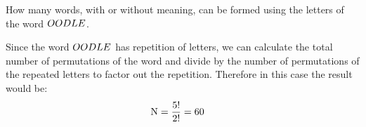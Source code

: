 



\question[2] How many words, with or without meaning, can be formed
using the letters of the word $OODLE$.



\watchout

\ifprintanswers
\fi 

\begin{solution}[\mcq]
  Since the word $OODLE$ has repetition of letters, we can calculate the
  total number of permutations of the word and divide by the number of
  permutations of the repeated letters to factor out the repetition.
  Therefore in this case the result would be:
  \begin{align}
  	\text{N} &= \dfrac{5!}{2!} = 60
  \end{align}

\end{solution}
